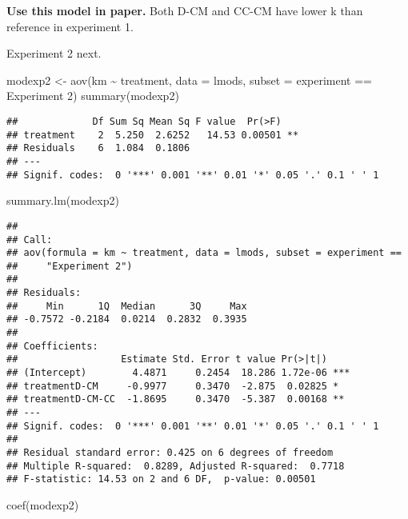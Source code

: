 \documentclass[
]{article}
\newenvironment{Shaded}{\begin{snugshade}}{\end{snugshade}}
\newcommand{\AttributeTok}[1]{\textcolor[rgb]{0.77,0.63,0.00}{#1}}
\newcommand{\FunctionTok}[1]{\textcolor[rgb]{0.00,0.00,0.00}{#1}}
\newcommand{\NormalTok}[1]{#1}
\newcommand{\OtherTok}[1]{\textcolor[rgb]{0.56,0.35,0.01}{#1}}
\newcommand{\SpecialCharTok}[1]{\textcolor[rgb]{0.00,0.00,0.00}{#1}}
\newcommand{\StringTok}[1]{\textcolor[rgb]{0.31,0.60,0.02}{#1}}
\begin{document}
\textbf{Use this model in paper.} Both D-CM and CC-CM have lower k than
reference in experiment 1.

Experiment 2 next.

\begin{Shaded}
\begin{Highlighting}[]
\NormalTok{modexp2 }\OtherTok{\textless{}{-}} \FunctionTok{aov}\NormalTok{(km }\SpecialCharTok{\textasciitilde{}}\NormalTok{ treatment, }\AttributeTok{data =}\NormalTok{ lmods, }\AttributeTok{subset =}\NormalTok{ experiment }\SpecialCharTok{==} \StringTok{\textquotesingle{}Experiment 2\textquotesingle{}}\NormalTok{)}
\FunctionTok{summary}\NormalTok{(modexp2)}
\end{Highlighting}
\end{Shaded}

\begin{verbatim}
##             Df Sum Sq Mean Sq F value  Pr(>F)   
## treatment    2  5.250  2.6252   14.53 0.00501 **
## Residuals    6  1.084  0.1806                   
## ---
## Signif. codes:  0 '***' 0.001 '**' 0.01 '*' 0.05 '.' 0.1 ' ' 1
\end{verbatim}

\begin{Shaded}
\begin{Highlighting}[]
\FunctionTok{summary.lm}\NormalTok{(modexp2)}
\end{Highlighting}
\end{Shaded}

\begin{verbatim}
## 
## Call:
## aov(formula = km ~ treatment, data = lmods, subset = experiment == 
##     "Experiment 2")
## 
## Residuals:
##     Min      1Q  Median      3Q     Max 
## -0.7572 -0.2184  0.0214  0.2832  0.3935 
## 
## Coefficients:
##                  Estimate Std. Error t value Pr(>|t|)    
## (Intercept)        4.4871     0.2454  18.286 1.72e-06 ***
## treatmentD-CM     -0.9977     0.3470  -2.875  0.02825 *  
## treatmentD-CM-CC  -1.8695     0.3470  -5.387  0.00168 ** 
## ---
## Signif. codes:  0 '***' 0.001 '**' 0.01 '*' 0.05 '.' 0.1 ' ' 1
## 
## Residual standard error: 0.425 on 6 degrees of freedom
## Multiple R-squared:  0.8289, Adjusted R-squared:  0.7718 
## F-statistic: 14.53 on 2 and 6 DF,  p-value: 0.00501
\end{verbatim}

\begin{Shaded}
\begin{Highlighting}[]
\FunctionTok{coef}\NormalTok{(modexp2)}
\end{Highlighting}
\end{Shaded}
\end{document}
